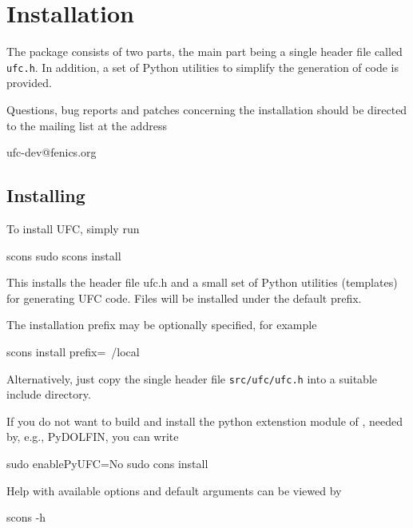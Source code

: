 \chapter{Installation}
\label{app:installation}

The \ufc{} package consists of two parts, the main part being a single
header file called \texttt{ufc.h}. In addition, a set of Python
utilities to simplify the generation of \ufc{} code is provided.

Questions, bug reports and patches concerning the installation should
be directed to the \ufc{} mailing list at the address
\begin{code}
ufc-dev@fenics.org
\end{code}

\section{Installing \ufc{}}

To install UFC, simply run
\begin{code}
scons
sudo scons install
\end{code}

This installs the header file ufc.h and a small set of Python
utilities (templates) for generating UFC code. Files will be installed
under the default prefix.

The installation prefix may be optionally specified, for example

\begin{code}
scons install prefix=~/local
\end{code}

Alternatively, just copy the single header file \texttt{src/ufc/ufc.h}
into a suitable include directory.

If you do not want to build and install the python extenstion module of \ufc{}, 
needed by, e.g., PyDOLFIN, you can write

\begin{code}
sudo enablePyUFC=No
sudo cons install
\end{code}

Help with available options and default arguments can be viewed by
\begin{code}
scons -h
\end{code}
